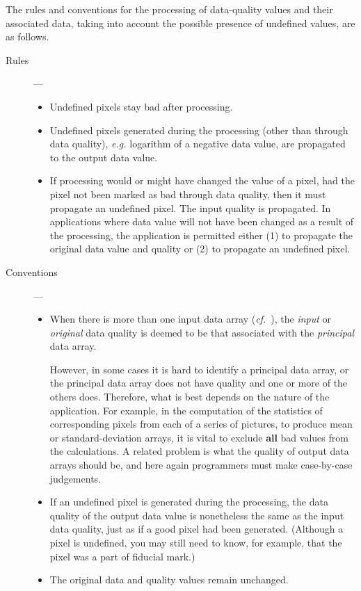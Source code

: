 \documentclass[twoside,11pt,nolof,noabs]{starlink}
\begin{document}
The rules and conventions for the processing of data-quality
values and their associated data, taking into account the possible
presence of undefined values, are as follows.
\begin{description}
\item [Rules] ---
\begin{itemize}
\item Undefined pixels stay bad after processing.
\item Undefined pixels generated during the processing (other than
through data quality), \textit{e.g.} logarithm of a negative data value,
are propagated to the output data value.
\item If processing would or might have changed the value
of a pixel, had the pixel
not been marked as bad through data quality, then it must propagate
an undefined pixel.  The input quality is propagated. In applications
where data value will not have been changed as a result of the
processing, the application is permitted either
(1) to propagate the original data
value and quality or (2) to propagate an undefined pixel.
\end{itemize}
\item [Conventions] ---
\begin{itemize}
\item When there is more than one input data array
(\textit{cf.}\ ),
the \textit{input} or \textit{original} data quality is deemed to be that
associated with the \textit{principal} data array.

However, in some cases it is hard to identify a
principal data array, or the principal data array does not have
quality and one or more of the others does.
Therefore, what is best depends on the
nature of the application.
For example, in the computation of the statistics of corresponding
pixels from each of a series of pictures, to produce mean or
standard-deviation arrays, it is vital to exclude \textbf{all}
bad values from the calculations.  A related problem is
what the quality of output data arrays should be, and
here again programmers must make case-by-case judgements.
\item If an undefined pixel is generated during the processing, the data
quality of the output data value is nonetheless
the same as the input data quality, just as
if a good pixel had been generated.  (Although a
pixel is undefined, you may still need to know, for example, that the
pixel was a part of fiducial mark.)
\item The original data and quality values remain unchanged.
\end{itemize}


\end{description}
\end{document}

